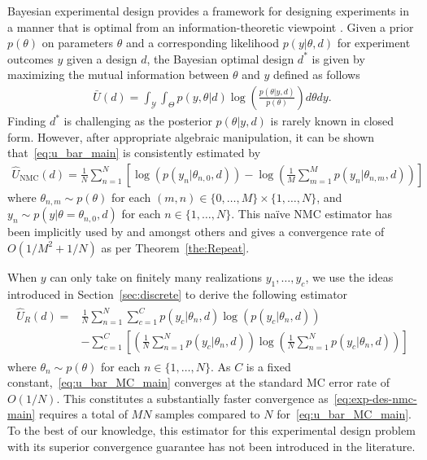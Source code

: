 Bayesian experimental design provides a framework for designing experiments in a manner that is optimal from
an information-theoretic viewpoint \citep{chaloner1995bayesian,sebastiani2000maximum}.  Given a prior
$p(\theta)$ on parameters $\theta$ and a corresponding likelihood $p(y|\theta,d)$ for experiment 
outcomes $y$ given a design $d$, the Bayesian optimal design $d^*$ is given by maximizing the mutual
information between $\theta$ and $y$ defined as follows
\begin{align}
\bar{U}(d)=
\int_{\mathcal{Y}}\int_{\Theta} p(y,\theta | d)\log\left(\frac{p(\theta |y, d)}{p(\theta)}\right)d\theta dy. 
\label{eq:u_bar_main}
\end{align}
Finding $d^*$ is challenging as the posterior $p(\theta |y, d)$ is rarely known in closed form.  
However, after appropriate algebraic manipulation, it can be shown that~\eqref{eq:u_bar_main}
is consistently estimated by
\begin{align}
\label{eq:exp-des-nmc-main}
\hat{U}_{\text{NMC}}(d) =
\frac{1}{N} \sum_{n=1}^{N} \left[ \log(p(y_n | \theta_{n,0},d)) 
- \log \left(\frac{1}{M} \sum_{m=1}^{M}p(y_n | \theta_{n,m},d)\right) \right]
\end{align}
where $\theta_{n,m} \sim p(\theta)$ for each $(m,n) \in \{0,\ldots,M\}\times \{1,\ldots,N\}$, 
and $y_n \sim p(y|\theta=\theta_{n,0}, d)$ for each $n \in \{1,\ldots,N\}$.  
This na\"{i}ve NMC estimator has been implicitly used by \cite{myung2013tutorial} and \cite{ouyang2016practical} amongst others and gives a convergence
rate of $O(1/M^2+1/N)$ as per Theorem~\ref{the:Repeat}.

When $y$ can only take on finitely many realizations $y_{1},\dots,y_c$, we use the ideas introduced
in Section~\ref{sec:discrete} to derive the following estimator
\begin{align}
\begin{split}
\label{eq:u_bar_MC_main}
\hat{U}_{R}(d) = &\frac{1}{N} \sum_{n=1}^{N} \sum_{c=1}^{C} p(y_c | \theta_n, d) \log\left(p(y_c | \theta_n, d)\right) \\
&- \sum_{c=1}^{C} \left[\left(\frac{1}{N}\sum_{n=1}^{N} p(y_c | \theta_n, d)\right) \log \left(\frac{1}{N} \sum_{n=1}^{N} p(y_c | \theta_n, d)\right) \right]
\end{split}
\end{align}
where $\theta_n \sim p(\theta)$ for each $n \in \{1,\dots,N\}$.  
As $C$ is a fixed
constant,~\eqref{eq:u_bar_MC_main} converges at the standard MC error rate of $O(1/N)$.  This constitutes
a substantially faster convergence as~\eqref{eq:exp-des-nmc-main} requires a total of $MN$
samples compared to $N$ for~\eqref{eq:u_bar_MC_main}.  To the best of our knowledge, this estimator for this experimental design problem with its superior convergence guarantee has not been introduced in the literature.


